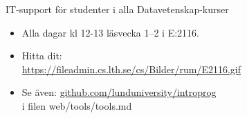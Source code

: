 \begin{SlideExtra}{IT-support för studenter i alla Datavetenskap-kurser}
\begin{itemize}
  \item Alla dagar kl 12-13 läsvecka 1--2 i E:2116. 
  \item Hitta dit: \\
  {\footnotesize\url{https://fileadmin.cs.lth.se/cs/Bilder/rum/E2116.gif}}
  \item Se även: \href{https://github.com/lunduniversity/introprog/blob/master/web/tools/tools.md}{github.com/lunduniversity/introprog}\\i filen web/tools/tools.md
\end{itemize}  
\end{SlideExtra}


\fi

